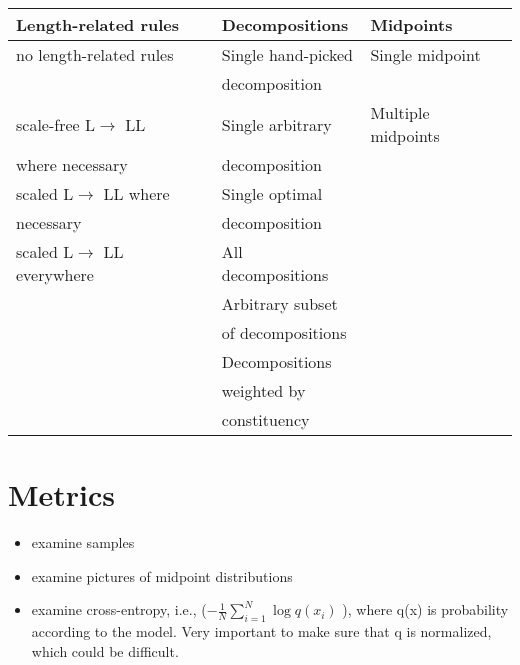 \documentclass{book}
\begin{document}
\begin{center}
\begin{tabular}{lll}
\hline
 \textbf{Length-related rules}  &  \textbf{Decompositions}  &  \textbf{Midpoints}  \\
\hline
 no length-related rules        &  Single hand-picked       &  Single midpoint     \\
                                &  decomposition            &                      \\
\hline
 scale-free L$\to$ LL           &  Single arbitrary         &  Multiple midpoints  \\
 where necessary                &  decomposition            &                      \\
\hline
 scaled L$\to$ LL where         &  Single optimal           &                      \\
 necessary                      &  decomposition            &                      \\
\hline
 scaled L$\to$ LL everywhere    &  All decompositions       &                      \\
\hline
                                &  Arbitrary subset         &                      \\
                                &  of decompositions        &                      \\
\hline
                                &  Decompositions           &                      \\
                                &  weighted by              &                      \\
                                &  constituency             &                      \\
\hline
\end{tabular}
\end{center}
\section{Metrics}
\label{sec-5_7}

\begin{itemize}
\item examine samples
\item examine pictures of midpoint distributions
\item examine cross-entropy, i.e., ($-\frac{1}{N} \sum_{i=1}^N
    \log q(x_i)$ ), where q(x) is probability according to the
    model. Very important to make sure that q is normalized, which
    could be difficult.
\end{itemize}
\end{document}
